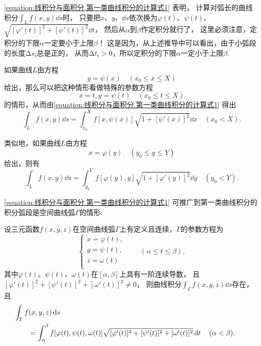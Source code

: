 \cref{equation:线积分与面积分.第一类曲线积分的计算式1} 表明，%
计算对弧长的曲线积分\(\int_L f(x,y) \dd{s}\)时，%
只要把\(x\)、\(y\)、\(\dd{s}\)依次换为\(\varphi(t)\)、\(\psi(t)\)、\(\sqrt{[\varphi'(t)]^2+[\psi'(t)]^2} \dd{t}\)，%
然后从\(\alpha\)到\(\beta\)作定积分就行了，%
这里必须注意，定积分的下限\(\alpha\)一定要小于上限\(\beta\)！
这是因为，从上述推导中可以看出，由于小弧段的长度\(\increment s_i\)总是正的，%
从而\(\increment t_i > 0\)，所以定积分的下限\(\alpha\)一定小于上限\(\beta\).

如果曲线\(L\)由方程\[
y = \psi(x)
\quad(x_0 \leqslant x \leqslant X)
\]给出，那么可以把这种情形看做特殊的参数方程\[
x = t,
y = \psi(t)
\quad(x_0 \leqslant t \leqslant X)
\]的情形，从而由\cref{equation:线积分与面积分.第一类曲线积分的计算式1} 得出
\begin{equation}
\int_L f(x,y) \dd{s}
= \int_{x_0}^X f[x,\psi(x)] \sqrt{1+[\psi'(x)]^2} \dd{x}
\quad(x_0 < X).
\end{equation}

类似地，如果曲线\(L\)由方程\[
x = \varphi(y)
\quad(y_0 \leqslant y \leqslant Y)
\]给出，则有
\begin{equation}
\int_L f(x,y) \dd{s}
= \int_{y_0}^Y f[\varphi(y),y] \sqrt{1+[\varphi'(y)]^2} \dd{y}
\quad(y_0 < Y).
\end{equation}

\cref{equation:线积分与面积分.第一类曲线积分的计算式1} 可推广到第一类曲线积分的积分弧段是空间曲线弧\(\Gamma\)的情形.
\begin{theorem}
设三元函数\(f(x,y,z)\)在空间曲线弧\(\Gamma\)上有定义且连续，\(\Gamma\)的参数方程为\[
\left\{ \begin{array}{l}
x = \varphi(t), \\
y = \psi(t), \\
z = \omega(t) \\
\end{array} \right.
\qquad
(\alpha \leqslant t \leqslant \beta),
\]其中\(\varphi(t)\)、\(\psi(t)\)、\(\omega(t)\)在\([\alpha,\beta]\)上具有一阶连续导数，%
且\([\varphi'(t)]^2+[\psi'(t)]^2+[\omega'(t)]^2 \neq 0\)，%
则曲线积分\(\int_{\Gamma} f(x,y,z) \dd{s}\)存在，%
且\begin{equation}\label{equation:线积分与面积分.第一类曲线积分的计算式2}
\begin{aligned}
&\hspace{-20pt}
\int_{\Gamma} f(x,y,z) \dd{s} \\
&= \int_{\alpha}^{\beta} f[\varphi(t),\psi(t),\omega(t)] \sqrt{[\varphi'(t)]^2+[\psi'(t)]^2+[\omega'(t)]^2} \dd{t}
\quad(\alpha<\beta).
\end{aligned}
\end{equation}
\end{theorem}

